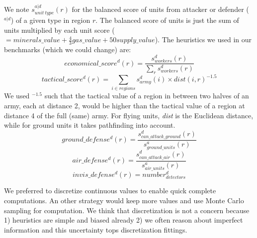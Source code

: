 We note $s^{a|d}_{unit\ type}(r)$ for the balanced score of units from attacker or defender ($^{a|d}$) of a given type in region $r$. The balanced score of units is just the sum of units multiplied by each unit score ($= minerals\_value + \frac{4}{3}gas\_value + 50supply\_value$). The heuristics we used in our benchmarks (which we could change) are: 
$$economical\_score^d(r) = \frac{s^d_{workers}(r)}{\sum_r s^d_{workers}(r)}$$
$$tactical\_score^d(r) = \sum_{i \in regions} s^d_{army}(i) \times dist(i,r)^{-1.5}$$
We used $^{-1.5}$ such that the tactical value of a region in between two halves of an army, each at distance 2, would be higher than the tactical value of a region at distance 4 of the full (same) army. For flying units, \textit{dist} is the Euclidean distance, while for ground units it takes pathfinding into account.
$$ground\_defense^d(r) = \frac{s^d_{can\_attack\_ground}(r)}{s^a_{ground\_units}(r)}$$
$$air\_defense^d(r) = \frac{s^d_{can\_attack\_air}(r)}{s^a_{air\_units}(r)}$$
$$invis\_defense^d(r) = number^d_{detectors}$$

We preferred to discretize continuous values to enable quick complete computations. An other strategy would keep more values and use Monte Carlo sampling for computation. We think that discretization is not a concern because 1) heuristics are simple and biased already 2) we often reason about imperfect information and this uncertainty tops discretization fittings.

